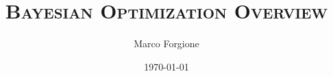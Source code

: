 \usepackage[english]{babel}
\usepackage{amsmath}
\usepackage[latin1]{inputenc}
\usepackage{units}
\usepackage{colortbl}
\usepackage{multimedia}
\usepackage{bm}

{
}
	

\title[Bayesian Optimization Overview]{\textsc{Bayesian Optimization Overview}}


\author[]{Marco Forgione}



\date[]{\today}


\subject{Bayesian Optimization}


\newcommand{\norm}[1]{\left \lVert #1 \right \rVert}
\DeclareMathOperator*\argmin{arg \, min}
\DeclareMathOperator*\cov{cov}


\newcommand{\K}{K}
\newcommand{\M}{M}
\newcommand{\Mo}{M_o}
\newcommand{\So}{S_o}
\newcommand{\Smod}{S}
\newcommand{\parcolor}[1]{{\color{orange}#1}}
